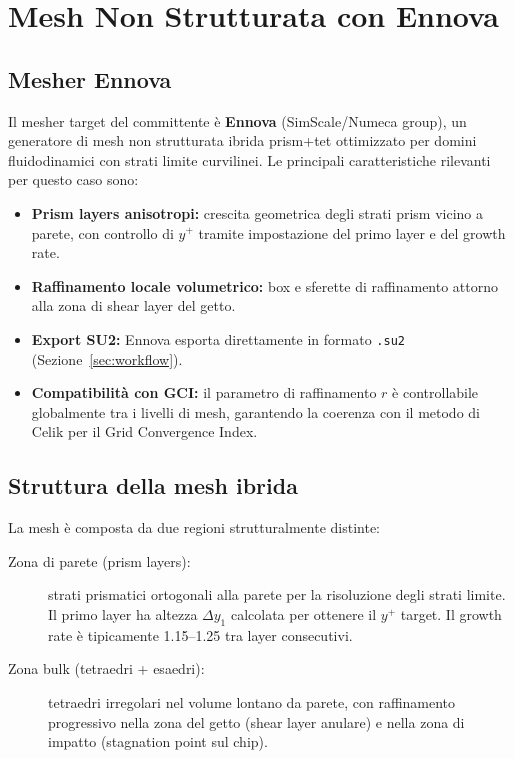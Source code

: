 \documentclass[11pt,a4paper]{article}
\begin{document}
\section{Mesh Non Strutturata con Ennova}
\label{sec:mesh}

\subsection{Mesher Ennova}

Il mesher target del committente è \textbf{Ennova} (SimScale/Numeca group), un generatore di mesh non strutturata ibrida prism+tet ottimizzato per domini fluidodinamici con strati limite curvilinei. Le principali caratteristiche rilevanti per questo caso sono:

\begin{itemize}
  \item \textbf{Prism layers anisotropi:} crescita geometrica degli strati prism vicino a parete, con controllo di $y^+$ tramite impostazione del primo layer e del growth rate.
  \item \textbf{Raffinamento locale volumetrico:} box e sferette di raffinamento attorno alla zona di shear layer del getto.
  \item \textbf{Export SU2:} Ennova esporta direttamente in formato \texttt{.su2} (Sezione~\ref{sec:workflow}).
  \item \textbf{Compatibilità con GCI:} il parametro di raffinamento $r$ è controllabile globalmente tra i livelli di mesh, garantendo la coerenza con il metodo di Celik \cite{Celik2008} per il Grid Convergence Index.
\end{itemize}

\subsection{Struttura della mesh ibrida}

La mesh è composta da due regioni strutturalmente distinte:

\begin{description}
  \item[Zona di parete (prism layers):] strati prismatici ortogonali alla parete per la risoluzione degli strati limite. Il primo layer ha altezza $\Delta y_1$ calcolata per ottenere il $y^+$ target. Il growth rate è tipicamente 1.15--1.25 tra layer consecutivi.
  \item[Zona bulk (tetraedri + esaedri):] tetraedri irregolari nel volume lontano da parete, con raffinamento progressivo nella zona del getto (shear layer anulare) e nella zona di impatto (stagnation point sul chip).
\end{description}
\end{document}
